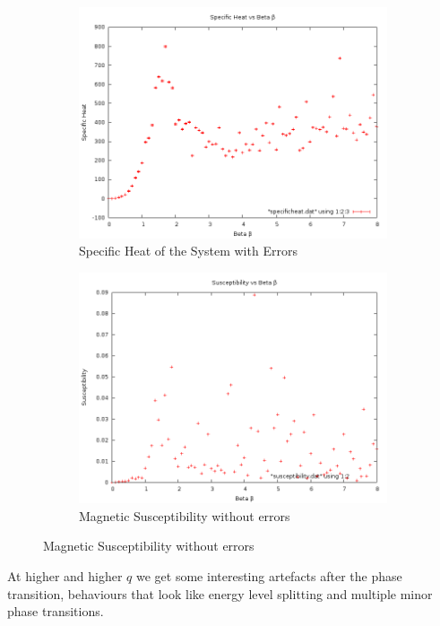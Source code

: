 \documentclass[12pt,a4paper,notitlepage,twoside]{article}
\begin{document}
\begin{figure}[H]
\centering
	\begin{subfigure}[b]{0.45\textwidth}
		\includegraphics[width=\textwidth]{q10d20/specificheat.png}	
		\caption{Specific Heat of the System with Errors}
	\end{subfigure}
	\begin{subfigure}[b]{0.45\textwidth}
		\includegraphics[width=\textwidth]{q10d20/susceptibility.png}
		\caption{Magnetic Susceptibility without errors}
	\end{subfigure}
\end{figure}

At higher and higher $q$ we get some interesting artefacts after the phase transition, behaviours that look like energy level splitting and multiple minor phase transitions.
\end{document}
